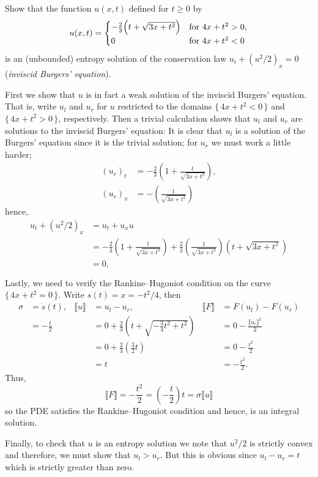 \begin{problem}
  Show that the function \(u(x,t)\) defined for \(t\geq 0\) by
  \[
    u(x,t)=
    \begin{cases}
      -\tfrac{2}{3}\Bigl(t+\sqrt{3x+t^2}\Bigr)
      &\text{for \(4x+t^2>0\),}\\
      0
      &\text{for \(4x+t^2<0\)}
    \end{cases}
  \]
  is an (unbounded) entropy solution of the conservation law
  \(u_t+(u^2/2)_x=0\) (\emph{inviscid Burgers' equation}).
\end{problem}
\begin{solution*}
  First we show that \(u\) is in fact a weak solution of the inviscid
  Burgers' equation. That is, write \(u_l\) and \(u_r\) for \(u\)
  restricted to the domains \(\{\,4x+t^2<0\,\}\) and \(\{\,4x+t^2>0\,\}\),
  respectively. Then a trivial calculation shows that \(u_l\) and \(u_r\)
  are solutions to the inviscid Burgers' equation: It is clear that \(u_l\)
  is a solution of the Burgers' equation since it is the trivial solution;
  for \(u_r\) we must work a little harder;
  \begin{align*}
    {(u_r)}_t&=-\frac{2}{3}\left(1+\frac{t}{\sqrt{3x+t^2}}\right),\\
    {(u_r)}_x&=-\left(\frac{1}{\sqrt{3x+t^2}}\right)
  \end{align*}
  hence,
  \begin{align*}
    u_t+(u^2/2)_x
    &=u_t+u_xu\\
    &=-\frac{2}{3}\left(1+\frac{t}{\sqrt{3x+t^2}}\right)
      +\frac{2}{3}
      \left(\frac{1}{\sqrt{3x+t^2}}\right)\left(t+\sqrt{3x+t^2}\right)\\
    &=0.
  \end{align*}

  Lastly, we need to verify the Rankine--Hugoniot condition on the curve
  \(\{\,4x+t^2=0\,\}\). Write \(s(t)=x=-t^2/4\), then
  \begin{align*}
    \sigma&=\dot s(t),
    &\llbracket u\rrbracket
    &=u_l-u_r,
    &\llbracket F\rrbracket
    &=F(u_l)-F(u_r)\\
          &=-\frac{t}{2}
    &&=0+\frac{2}{3}\left(t+\sqrt{-\tfrac{3}{4}t^2+t^2}\right)
    &&=0-\frac{\llbracket u_r\rrbracket^2}{2}\\
          &&
    &=0+\frac{2}{3}\left(\frac{3}{2}t\right)
    &&=0-\frac{t^2}{2}
    \\
          &&&=t&&=-\frac{t^2}{2}.
  \end{align*}
  Thus,
  \[
    \llbracket
    F\rrbracket=-\frac{t^2}{2}=\left(-\frac{t}{2}\right)t=\sigma\llbracket
    u\rrbracket
  \]
  so the PDE satisfies the Rankine--Hugoniot condition and hence, is an
  integral solution.

  Finally, to check that \(u\) is an entropy solution we note that
  \(u^2/2\) is strictly convex and therefore, we must show that
  \(u_l>u_r\). But this is obvious since \(u_l-u_r=t\) which is strictly
  greater than zero.
\end{solution*}

